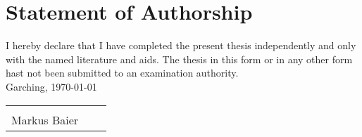 \chapter*{Statement of Authorship}

\vspace{1.5cm}
I hereby declare that I have completed the present thesis independently and only with the named literature and aids. The thesis in this form or in any other form hast not been submitted to an examination authority.\\

\vspace{1.5cm}
Garching, \today
\vspace{1.5cm}
 
\begin{tabular}{p{7cm}p{.5cm}l}
	\dotfill \\ 
	Markus Baier
\end{tabular}%

